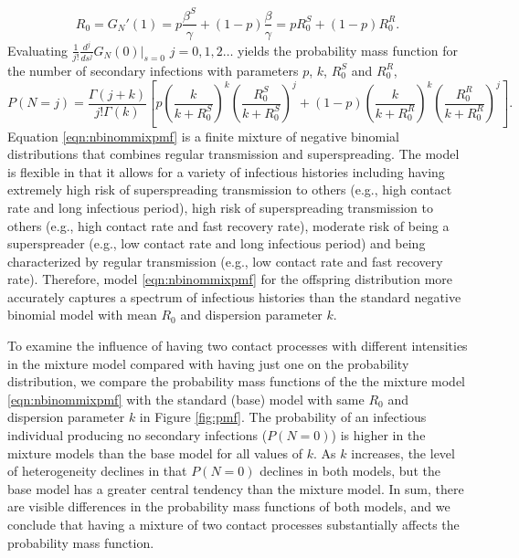 \documentclass{imammb}
\numberwithin{equation}{section}
\begin{document}
\begin{equation}\label{eqn:R0}
   R_0= G_N'(1) = p\frac{ \beta^S }{\gamma } +(1-p)\frac{ \beta }  {\gamma  } = p R_0^S + (1-p) R_0^R.%
\end{equation}
Evaluating $\frac{1}{j!} \frac{d^j}{ds^j} G_N(0) |_{s=0}$ $j=0,1,2\dots$ yields the probability mass function for the number of secondary infections with parameters $p$, $k$, $R_0^S$ and $R_0^R$,
\begin{equation}\label{eqn:nbinommixpmf}
    P(N=j) =  \frac{\Gamma(j+k)}{j! \Gamma (k)} \left [ p \left(\frac{k}{k+R_0^S} \right)^{k}\left (\frac{R_0^S}{k+R_0^S} \right )^j+ (1-p) \left(\frac{k}{k+R_0^R} \right)^{k}\left (\frac{R_0^R}{k+R_0^R} \right )^j \right ].
\end{equation}
Equation \eqref{eqn:nbinommixpmf} is a finite mixture of negative binomial distributions that combines regular transmission and superspreading. %
The model is flexible in that it allows for a variety of infectious histories including having extremely high risk of superspreading transmission to others (e.g., high contact rate and long infectious period), high risk of superspreading transmission to others (e.g., high contact rate and fast recovery rate), moderate risk of being a superspreader (e.g., low contact rate and long infectious period) and being characterized by regular transmission (e.g., low contact rate and fast recovery rate). Therefore, model \eqref{eqn:nbinommixpmf} for the offspring distribution more accurately captures a spectrum of infectious histories than the standard negative binomial model with mean $R_0$ and dispersion parameter $k$. 

To examine the influence of having two contact processes with different intensities in the mixture model compared with having just one on the probability distribution, we compare the probability mass functions of the the mixture model \eqref{eqn:nbinommixpmf} with the standard (base) model with same $R_0$ and dispersion parameter $k$ in Figure \ref{fig:pmf}. The probability of an infectious individual producing no secondary infections ($P(N=0)$) is higher in the mixture models than the base model for all values of $k$. As $k$ increases, the level of heterogeneity declines in that $P(N=0)$ declines in both models, but the base model has a greater central tendency than the mixture model. In sum, there are visible differences in the probability mass functions of both models, and we conclude that having a mixture of two contact processes substantially affects the probability mass function. 
\end{document}
